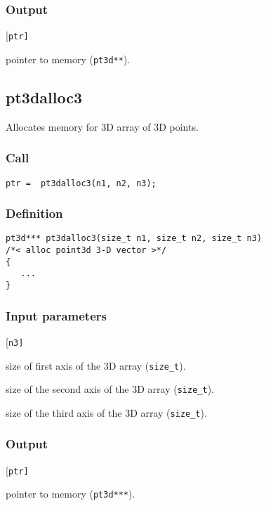 \subsubsection*{Output}
\begin{desclist}{\tt }{\quad}[\tt ptr]
   \setlength\itemsep{0pt}
   \item[ptr] pointer to memory (\texttt{pt3d**}).
\end{desclist}





\subsection{{pt3dalloc3}}
Allocates memory for 3D array of 3D points.

\subsubsection*{Call}
\begin{verbatim}ptr =  pt3dalloc3(n1, n2, n3); \end{verbatim}

\subsubsection*{Definition}
\begin{verbatim}
pt3d*** pt3dalloc3(size_t n1, size_t n2, size_t n3)
/*< alloc point3d 3-D vector >*/
{
   ...
}
\end{verbatim}

\subsubsection*{Input parameters}
\begin{desclist}{\tt }{\quad}[\tt n3]
   \setlength\itemsep{0pt}
   \item[n1]	size of first axis of the 3D array (\texttt{size\_t}).
   \item[n2]	size of the second axis of the 3D array (\texttt{size\_t}).
   \item[n3]	size of the third axis of the 3D array (\texttt{size\_t}).
\end{desclist}

\subsubsection*{Output}
\begin{desclist}{\tt }{\quad}[\tt ptr]
   \setlength\itemsep{0pt}
   \item[ptr] pointer to memory (\texttt{pt3d***}).
\end{desclist}



